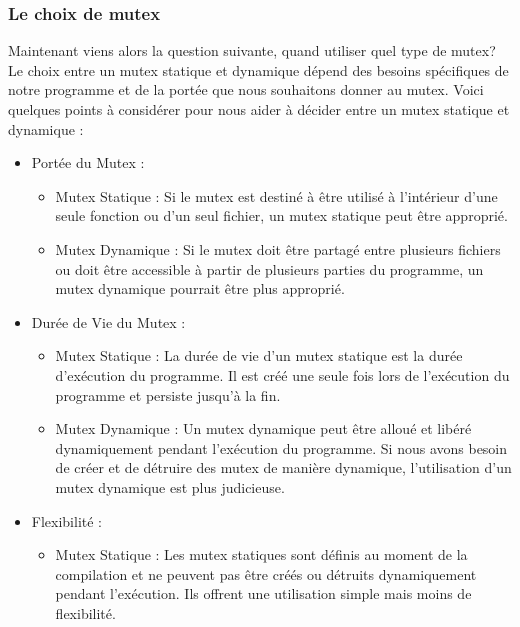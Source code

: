 \subsubsection{Le choix de mutex}


Maintenant viens alors la question suivante, quand utiliser quel type de mutex? Le choix entre un mutex statique et dynamique dépend des besoins spécifiques de notre programme et de la portée que nous souhaitons donner au mutex. Voici quelques points à considérer pour nous aider à décider entre un mutex statique et dynamique :
\vspace{\baselineskip}
\begin{itemize}
    \item Portée du Mutex :
    \begin{itemize}
    \vspace{\baselineskip}
        \item Mutex Statique : Si le mutex est destiné à être utilisé à l'intérieur d'une seule fonction ou d'un seul fichier, un mutex statique peut être approprié.
        \\
        \item Mutex Dynamique : Si le mutex doit être partagé entre plusieurs fichiers ou doit être accessible à partir de plusieurs parties du programme, un mutex dynamique pourrait être plus approprié.
    \end{itemize}
\vspace{\baselineskip}
    \item Durée de Vie du Mutex :
    \vspace{\baselineskip}
    \begin{itemize}
        \item Mutex Statique : La durée de vie d'un mutex statique est la durée d'exécution du programme. Il est créé une seule fois lors de l'exécution du programme et persiste jusqu'à la fin.
        \\ 
        \item Mutex Dynamique : Un mutex dynamique peut être alloué et libéré dynamiquement pendant l'exécution du programme. Si nous avons besoin de créer et de détruire des mutex de manière dynamique, l'utilisation d'un mutex dynamique est plus judicieuse.
    \end{itemize}
\vspace{\baselineskip}
    \item Flexibilité :
    \vspace{\baselineskip}
    \begin{itemize}
        \item Mutex Statique : Les mutex statiques sont définis au moment de la compilation et ne peuvent pas être créés ou détruits dynamiquement pendant l'exécution. Ils offrent une utilisation simple mais moins de flexibilité.

\end{itemize}
\end{itemize}
